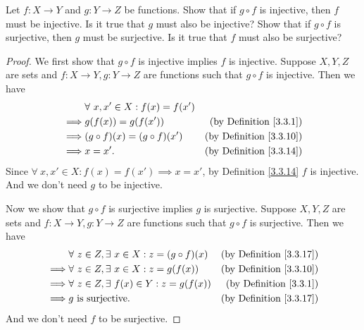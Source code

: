 \begin{exercise}\label{ex 3.3.5}
    Let \(f : X \to Y\) and \(g : Y \to Z\) be functions.
    Show that if \(g \circ f\) is injective, then \(f\) must be injective.
    Is it true that \(g\) must also be injective?
    Show that if \(g \circ f\) is surjective, then \(g\) must be surjective.
    Is it true that \(f\) must also be surjective?
\end{exercise}

\begin{proof}
    We first show that \(g \circ f\) is injective implies \(f\) is injective.
    Suppose \(X, Y, Z\) are sets and \(f : X \to Y, g : Y \to Z\) are functions such that \(g \circ f\) is injective.
    Then we have
    \begin{align*}
                 & \forall\ x, x' \in X : f(x) = f(x')                                       \\
        \implies & g(f(x)) = g(f(x'))                  & \text{(by Definition \ref{3.3.1})}  \\
        \implies & (g \circ f)(x) = (g \circ f)(x')    & \text{(by Definition \ref{3.3.10})} \\
        \implies & x = x'.                             & \text{(by Definition \ref{3.3.14})}
    \end{align*}
    Since \(\forall\ x, x' \in X : f(x) = f(x') \implies x = x'\), by Definition \ref{3.3.14} \(f\) is injective.
    And we don't need \(g\) to be injective.

    Now we show that \(g \circ f\) is surjective implies \(g\) is surjective.
    Suppose \(X, Y, Z\) are sets and \(f : X \to Y, g : Y \to Z\) are functions such that \(g \circ f\) is surjective.
    Then we have
    \begin{align*}
                 & \forall\ z \in Z, \exists\ x \in X : z = (g \circ f)(x) & \text{(by Definition \ref{3.3.17})} \\
        \implies & \forall\ z \in Z, \exists\ x \in X : z = g(f(x))        & \text{(by Definition \ref{3.3.10})} \\
        \implies & \forall\ z \in Z, \exists\ f(x) \in Y : z = g(f(x))     & \text{(by Definition \ref{3.3.1})}  \\
        \implies & g \text{ is surjective}.                                & \text{(by Definition \ref{3.3.17})}
    \end{align*}
    And we don't need \(f\) to be surjective.
\end{proof}

